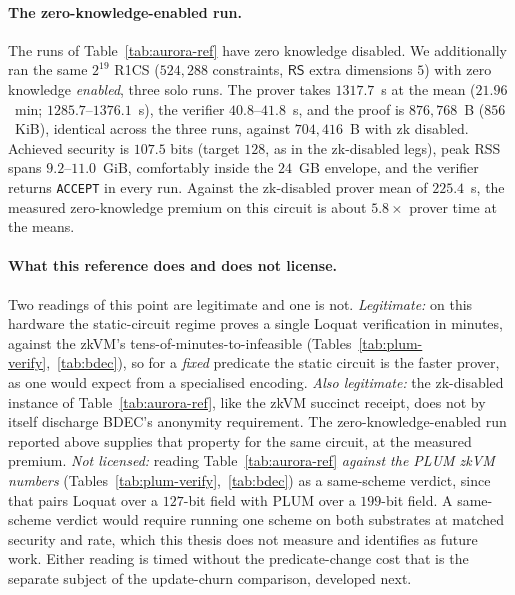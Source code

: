 \paragraph{The zero-knowledge-enabled run.}
The runs of Table~\ref{tab:aurora-ref} have zero knowledge disabled. We additionally ran the same $2^{19}$ R1CS ($524{,}288$ constraints, $\mathsf{RS}$ extra dimensions $5$) with zero knowledge \emph{enabled}, three solo runs. The prover takes $1317.7$~s at the mean ($21.96$~min; $1285.7$--$1376.1$~s), the verifier $40.8$--$41.8$~s, and the proof is $876{,}768$~B ($856$~KiB), identical across the three runs, against $704{,}416$~B with zk disabled. Achieved security is $107.5$ bits (target $128$, as in the zk-disabled legs), peak RSS spans $9.2$--$11.0$~GiB, comfortably inside the $24$~GB envelope, and the verifier returns \texttt{ACCEPT} in every run. Against the zk-disabled prover mean of $225.4$~s, the measured zero-knowledge premium on this circuit is about $5.8\times$ prover time at the means.

\paragraph{What this reference does and does not license.}
Two readings of this point are legitimate and one is not. \emph{Legitimate:} on this hardware the static-circuit regime proves a single Loquat verification in minutes, against the zkVM's tens-of-minutes-to-infeasible (Tables~\ref{tab:plum-verify},~\ref{tab:bdec}), so for a \emph{fixed} predicate the static circuit is the faster prover, as one would expect from a specialised encoding. \emph{Also legitimate:} the zk-disabled instance of Table~\ref{tab:aurora-ref}, like the zkVM succinct receipt, does not by itself discharge BDEC's anonymity requirement. The zero-knowledge-enabled run reported above supplies that property for the same circuit, at the measured premium. \emph{Not licensed:} reading Table~\ref{tab:aurora-ref} \emph{against the PLUM zkVM numbers} (Tables~\ref{tab:plum-verify},~\ref{tab:bdec}) as a same-scheme verdict, since that pairs Loquat over a $127$-bit field with PLUM over a $199$-bit field. A same-scheme verdict would require running one scheme on both substrates at matched security and rate, which this thesis does not measure and identifies as future work. Either reading is timed without the predicate-change cost that is the separate subject of the update-churn comparison, developed next.

